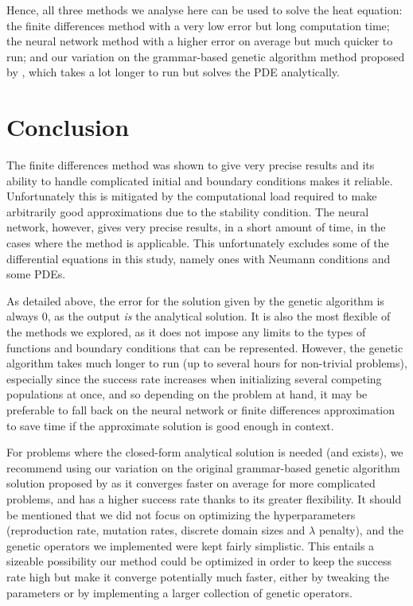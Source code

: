 \documentclass[aps,reprint,superscriptaddress,nofootinbib]{revtex4-2}
\begin{document}
    Hence, all three methods we analyse here can be used to solve the heat equation: the finite differences method with a very low error but long computation time; the neural network method with a higher error on average but much quicker to run; and our variation on the grammar-based genetic algorithm method proposed by \cite{solving_diff_reproduce}, which takes a lot longer to run but solves the PDE analytically.

\clearpage
\section{Conclusion}

The finite differences method was shown to give very precise results and its ability to handle complicated initial and boundary conditions makes it reliable. Unfortunately this is mitigated by the computational load required to make arbitrarily good approximations due to the stability condition. The neural network, however, gives very precise results, in a short amount of time, in the cases where the method is applicable. This unfortunately excludes some of the differential equations in this study, namely ones with Neumann conditions and some PDEs.

As detailed above, the error for the solution given by the genetic algorithm is always 0, as the output \textit{is} the analytical solution. It is also the most flexible of the methods we explored, as it does not impose any limits to the types of functions and boundary conditions that can be represented. However, the genetic algorithm takes much longer to run (up to several hours for non-trivial problems), especially since the success rate increases when initializing several competing populations at once, and so depending on the problem at hand, it may be preferable to fall back on the neural network or finite differences approximation to save time if the approximate solution is good enough in context.

For problems where the closed-form analytical solution is needed (and exists), we recommend using our variation on the original grammar-based genetic algorithm solution proposed by \cite{solving_diff_reproduce} as it converges faster on average for more complicated problems, and has a higher success rate thanks to its greater flexibility. It should be mentioned that we did not focus on optimizing the hyperparameters (reproduction rate, mutation rates, discrete domain sizes and \(\lambda\) penalty), and the genetic operators we implemented were kept fairly simplistic. This entails a sizeable possibility our method could be optimized in order to keep the success rate high but make it converge potentially much faster, either by tweaking the parameters or by implementing a larger collection of genetic operators.
\end{document}

